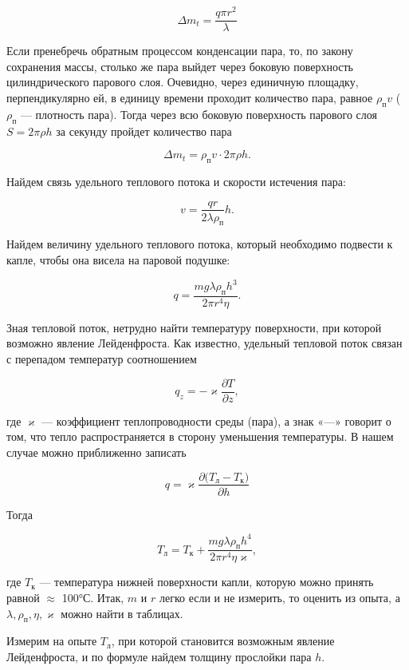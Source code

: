 \documentclass[a4paper,12pt]{article} %
\begin{document}
$$\Delta m_t = \frac{q \pi r^2}{\lambda}$$

\noindent Если пренебречь обратным процессом конденсации пара, то, по закону сохранения массы, столько же пара выйдет через боковую поверхность цилиндрического парового слоя. Очевидно, через единичную площадку, перпендикулярно ей, в единицу времени проходит количество пара, равное $\rho_{\text{п}} v$ ($\rho_{\text{п}}$ — плотность пара). Тогда через всю боковую поверхность парового слоя $S = 2 \pi \rho h$ за секунду пройдет количество пара

$$ \Delta m_t = \rho_{\text{п}} v \cdot 2 \pi \rho h . $$

\noindent Найдем связь удельного теплового потока и скорости истечения пара:

$$ v = \frac{qr}{2 \lambda \rho_{\text{п}}} h . $$

\noindent Найдем величину удельного теплового потока, который необходимо подвести к капле, чтобы она висела на паровой подушке: 

$$ q = \frac{mg \lambda \rho_{\text{п}} h^3}{2 \pi r^4 \eta} . $$

\noindent Зная тепловой поток, нетрудно найти температуру поверхности, при которой возможно явление Лейденфроста. Как известно, удельный тепловой поток связан с перепадом температур соотношением

$$ q_z = - \varkappa \frac{\partial T}{\partial z} ,$$

\noindent где $\varkappa$ — коэффициент теплопроводности среды (пара), а знак «—» говорит о том, что тепло распространяется в сторону уменьшения температуры. В нашем случае можно приближенно записать

$$ q = \varkappa \frac{\partial {(T_{\text{л}} - T_{\text{к}}})}{\partial h}  $$

Тогда

$$ T_{\text{л}} = T_{\text{к}} + \frac{mg \lambda \rho_{\text{п}} h^4 }{2 \pi r^4 \eta \varkappa} ,  $$

\noindent где $T_{\text{к}}$ — температура нижней поверхности капли, которую можно принять равной $\approx$ 100°С.
\noindent Итак, $m$ и $r$ легко если и не измерить, то оценить из опыта, а $\lambda, \rho_{\text{п}}, \eta, \varkappa$ можно найти в таблицах.

\medskip

\noindent Измерим на опыте $T_{\text{л}}$, при которой становится возможным явление Лейденфроста, и по формуле найдем толщину прослойки пара $h$.

\medskip
\end{document}
